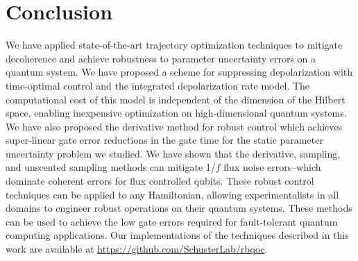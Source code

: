 \section{Conclusion}
We have applied state-of-the-art trajectory
optimization techniques to mitigate decoherence and
achieve robustness to parameter uncertainty
errors on a quantum system.
We have proposed a scheme for suppressing
depolarization with time-optimal
control and the integrated depolarization rate model.
The computational cost of this model is
independent of the dimension of the Hilbert space, enabling
inexpensive optimization on high-dimensional quantum systems.
We have also proposed the derivative method for robust control which achieves
super-linear gate error reductions in the gate time for the static parameter
uncertainty problem we studied.
We have shown that the derivative, sampling, and unscented sampling methods
can mitigate 1/$f$ flux noise errors--which
dominate coherent errors for flux controlled qubits.
These robust control techniques can be applied
to any Hamiltonian,
allowing experimentalists in all domains to engineer robust
operations on their quantum systems.
These methods can be used to achieve the low gate errors
required for fault-tolerant quantum computing applications. Our
implementations of the techniques described in this work are available
at \url{https://github.com/SchusterLab/rbqoc}.
